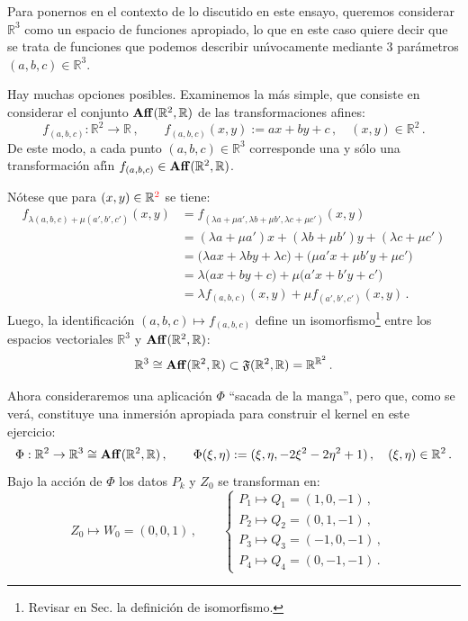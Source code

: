 \smallskip\noindent
Para ponernos en el contexto de lo discutido en este ensayo,
queremos considerar $\mathbb{R}^3$ como un espacio de funciones
apropiado, lo que en este caso quiere decir que se trata de
funciones que podemos describir un\'\i vocamente mediante 3
par\'ametros $(a,b,c)\in\mathbb{R}^3$.

\smallskip\noindent
Hay muchas opciones posibles.
Examinemos la m\'as simple, que consiste en considerar el conjunto
${\rm\bf Aff}(\mathbb{R}^2,\mathbb{R})$ de las transformaciones afines:
$$
f_{(a,b,c)}:\mathbb{R}^2\to\mathbb{R}\,,\qquad
f_{(a,b,c)}(x,y):= ax+by+c\,,\quad (x,y)\in\mathbb{R}^2\,.
$$
De este modo, a cada punto $(a,b,c)\in\mathbb{R}^3$ corresponde una
y s\'olo una transformaci\'on af\'\i n
$f_{(a,b,c)}\in{\rm\bf Aff}(\mathbb{R}^2,\mathbb{R})$.

\smallskip\noindent
N\'otese que para $(x,y)\in\mathbb{R}^{\textcolor{red}{2}}$ se tiene:
\begin{align*}
f_{\lambda(a,b,c)+\mu(a',b',c')}(x,y)
&= f_{(\lambda a + \mu a',\lambda b + \mu b',\lambda c + \mu c')}(x,y) \\
&= (\lambda a + \mu a')x + (\lambda b + \mu b')y + (\lambda c + \mu c') \\
&= \big( \lambda a x + \lambda b y + \lambda c \big) +
   \big( \mu a' x + \mu b' y + \mu c' \big) \\
&= \lambda \big( a x + b y + c \big) + \mu \big( a' x + b' y + c' \big) \\
&= \lambda f_{(a,b,c)}(x,y) + \mu f_{(a',b',c')}(x,y)\,.
\end{align*}
Luego, la identificaci\'on $(a,b,c)\mapsto f_{(a,b,c)}$ define un
isomorfismo\footnote{Revisar en Sec. \label{sec:def} la definici\'on de isomorfismo.} entre los espacios vectoriales $\mathbb{R}^3$ y
${\rm\bf Aff}(\mathbb{R}^2,\mathbb{R})$:
$$
\mathbb{R}^3 \cong {\rm\bf Aff}(\mathbb{R}^2,\mathbb{R})
\subset \mathfrak{F}(\mathbb{R}^2,\mathbb{R})
= \mathbb{R}^{\mathbb{R}^2}\,.
$$

\smallskip\noindent
Ahora consideraremos una aplicaci\'on $\Phi$ ``sacada de la manga'',
pero que, como se ver\'a, constituye una inmersi\'on apropiada
para construir el kernel en este ejercicio:
$$
\Phi:\mathbb{R}^2\to\mathbb{R}^3 \cong 
{\rm\bf Aff}(\mathbb{R}^2,\mathbb{R})\,,\qquad
\Phi(\xi,\eta):= (\xi,\eta, -2\xi^2-2\eta^2+1)\,,\quad 
(\xi,\eta)\in\mathbb{R}^2\,.
$$
Bajo la acci\'on de $\Phi$ los datos $P_k$ y $Z_0$ se transforman en:
\begin{equation*}
Z_0\mapsto W_0 = (0,0,1)\,,\qquad
\begin{cases}
P_1\mapsto Q_1 = (1,0,-1)\,, & \\
P_2\mapsto Q_2 = (0,1,-1)\,, & \\
P_3\mapsto Q_3 = (-1,0,-1)\,, & \\
P_4\mapsto Q_4 = (0,-1,-1)\,. &
\end{cases}
\end{equation*}


